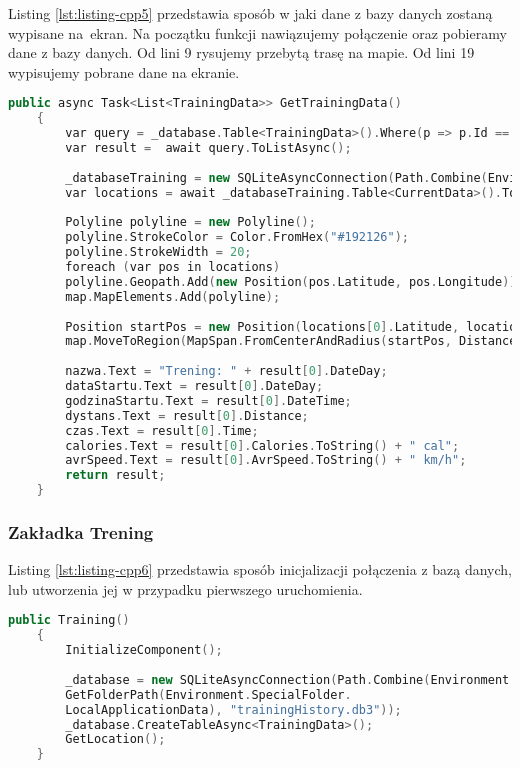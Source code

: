 Listing \ref{lst:listing-cpp5} przedstawia sposób w jaki dane z bazy danych zostaną wypisane na~ekran. Na początku funkcji nawiązujemy połączenie oraz pobieramy dane z bazy danych. Od lini 9 rysujemy przebytą trasę na mapie. Od lini 19 wypisujemy pobrane dane na ekranie.
\begin{lstlisting}[caption=Wypisanie danych z bazy danych na ekran, label={lst:listing-cpp5}, language=C++]
	public async Task<List<TrainingData>> GetTrainingData()
	{
		var query = _database.Table<TrainingData>().Where(p => p.Id == buttonId);
		var result =  await query.ToListAsync();
		
		_databaseTraining = new SQLiteAsyncConnection(Path.Combine(Environment.GetFolderPath(Environment.SpecialFolder.LocalApplicationData), result[0].TrainingDatabase));
		var locations = await _databaseTraining.Table<CurrentData>().ToListAsync();
		
		Polyline polyline = new Polyline();
		polyline.StrokeColor = Color.FromHex("#192126");
		polyline.StrokeWidth = 20;
		foreach (var pos in locations)
		polyline.Geopath.Add(new Position(pos.Latitude, pos.Longitude));
		map.MapElements.Add(polyline);
		
		Position startPos = new Position(locations[0].Latitude, locations[0].Longitude);
		map.MoveToRegion(MapSpan.FromCenterAndRadius(startPos, Distance.FromKilometers(1)));
		
		nazwa.Text = "Trening: " + result[0].DateDay;
		dataStartu.Text = result[0].DateDay;
		godzinaStartu.Text = result[0].DateTime;
		dystans.Text = result[0].Distance;
		czas.Text = result[0].Time;
		calories.Text = result[0].Calories.ToString() + " cal";
		avrSpeed.Text = result[0].AvrSpeed.ToString() + " km/h";
		return result;
	}
\end{lstlisting}

\subsubsection{Zakładka Trening} %

\hspace{0.60cm}Listing \ref{lst:listing-cpp6} przedstawia sposób inicjalizacji połączenia z bazą danych, lub utworzenia jej w przypadku pierwszego uruchomienia.
\begin{lstlisting}[caption=Połączenie z bazą danych, label={lst:listing-cpp6}, language=C++]
	public Training()
	{
		InitializeComponent();
		
		_database = new SQLiteAsyncConnection(Path.Combine(Environment.
		GetFolderPath(Environment.SpecialFolder.
		LocalApplicationData), "trainingHistory.db3"));
		_database.CreateTableAsync<TrainingData>();
		GetLocation();
	}
\end{lstlisting}

